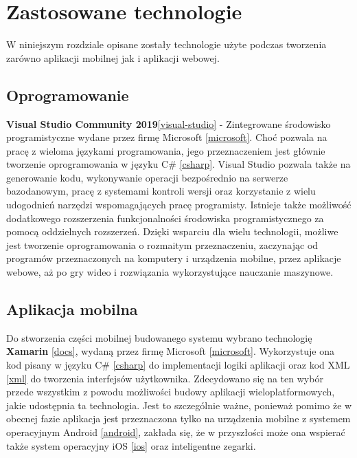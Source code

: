 \chapter{Zastosowane technologie}\label{chap:zastosowane-technologie}
W niniejszym rozdziale opisane zostały technologie użyte podczas tworzenia zarówno aplikacji mobilnej jak i aplikacji webowej.
\section{Oprogramowanie}
\textbf{Visual Studio Community 2019}\ref{visual-studio} - Zintegrowane środowisko programistyczne wydane przez firmę Microsoft \ref{microsoft}. Choć pozwala na pracę z wieloma językami programowania, jego przeznaczeniem jest głównie tworzenie oprogramowania w języku C\# \ref{csharp}. Visual Studio pozwala także na generowanie kodu, wykonywanie operacji bezpośrednio na serwerze bazodanowym, pracę z systemami kontroli wersji oraz korzystanie z wielu udogodnień narzędzi wspomagających pracę programisty. Istnieje także możliwość dodatkowego rozszerzenia funkcjonalności środowiska programistycznego za pomocą oddzielnych rozszerzeń. Dzięki wsparciu dla wielu technologii, możliwe jest tworzenie oprogramowania o rozmaitym przeznaczeniu, zaczynając od programów przeznaczonych na komputery i urządzenia mobilne, przez aplikacje webowe, aż po gry wideo i rozwiązania wykorzystujące nauczanie maszynowe.

\section{Aplikacja mobilna}
Do stworzenia części mobilnej budowanego systemu wybrano technologię \textbf{Xamarin} \ref{docs}, wydaną przez firmę Microsoft \ref{microsoft}. Wykorzystuje ona kod pisany w języku C\# \ref{csharp} do implementacji logiki aplikacji oraz kod XML \ref{xml} do tworzenia interfejsów użytkownika. Zdecydowano się na ten wybór przede wszystkim z powodu możliwości budowy aplikacji wieloplatformowych, jakie udostępnia ta technologia. Jest to szczególnie ważne, ponieważ pomimo że w obecnej fazie aplikacja jest przeznaczona tylko na urządzenia mobilne z systemem operacyjnym Android \ref{android}, zakłada się, że w przyszłości może ona wspierać także system operacyjny iOS \ref{ios} oraz inteligentne zegarki.

